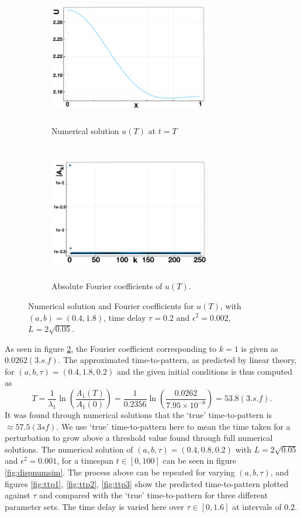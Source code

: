 \begin{figure}[H]
    \centering
    \begin{subfigure}[b]{0.45\textwidth}
        \centering
        \includegraphics[width=7cm,height=6cm]{Tu.png}
        \caption{Numerical solution $u(T)$ at $t=T$}
        \label{uT}
    \end{subfigure}
    \hfill
    \begin{subfigure}[b]{0.45\textwidth}
        \centering
        \includegraphics[width=7cm,height=6cm]{Tfc.png}
        \caption{Absolute Fourier coefficients of $u(T)$.}
        \label{fig:uTfc}
    \end{subfigure}
    \caption{Numerical solution and Fourier coefficients for $u(T)$, with $(a,b)=(0.4,1.8)$, time delay $\tau=0.2$ and $\epsilon^2=0.002$, $L=2\sqrt{0.05}$.}
    \label{fig:Tfc}
\end{figure}
As seen in figure \ref{fig:uTfc}, the Fourier coefficient corresponding to $k=1$ is given as $0.0262(3.s.f)$. The approximated time-to-pattern, as predicted by linear theory, for $(a,b,\tau)=(0.4,1.8,0.2)$ and the given initial conditions is thus computed as
\begin{equation}
    T=\frac{1}{\lambda_1}\ln\left(\frac{A_1(T)}{A_1(0)}\right)=\frac{1}{0.2356}\ln\left(\frac{0.0262}{7.95\times10^{-8}}\right)=53.8(3.s.f).
\end{equation}
It was found through numerical solutions that the `true' time-to-pattern is $\approx57.5(3sf)$.
We use `true' time-to-pattern here to mean the time taken for a perturbation to grow above a threshold value found through full numerical solutions.
 The numerical solution of $(a,b,\tau)=(0.4,0.8,0.2)$ with $L=2\sqrt{0.05}$ and $\epsilon^2=0.001$, for a timespan $t\in[0,100]$ can be seen in figure \ref{fig:dispnumsim}. The process above can be repeated for varying $(a,b,\tau)$, and figures \ref{fig:ttp1}, \ref{fig:ttp2}, \ref{fig:ttp3} show the predicted time-to-pattern plotted against $\tau$ and compared with the `true' time-to-pattern for three different parameter sets. The time delay is varied here over $\tau\in[0,1.6]$ at intervals of $0.2$.

